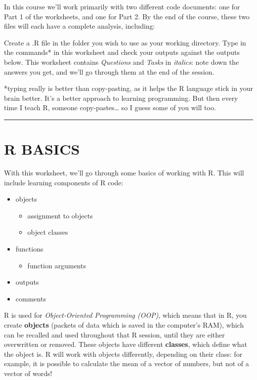 \documentclass[
]{book}
\providecommand{\tightlist}{%
  \setlength{\itemsep}{0pt}\setlength{\parskip}{0pt}}
\begin{document}
In this course we'll work primarily with two different code documents: one
for Part 1 of the worksheets, and one for Part 2. By the end of the course,
these two files will each have a complete analysis, including:

Create a .R file in the folder you wish to use as your working directory. Type
in the commands* in this worksheet and check your outputs against the outputs
below. This worksheet contains \emph{Questions} and \emph{Tasks} in \emph{italics}: note
down the answers you get, and we'll go through them at the end of the session.

*typing really is better than copy-pasting, as it helps the R language stick in your
brain better. It's a better approach to learning programming. But then every time I teach R,
someone copy-pastes\ldots{} so I guess some of you will too.

\begin{center}\rule{0.5\linewidth}{0.5pt}\end{center}

\hypertarget{r-basics-1}{%
\section{R BASICS}\label{r-basics-1}}

With this worksheet, we'll go through some basics of working with R. This will
include learning components of R code:

\begin{itemize}
\tightlist
\item
  objects

  \begin{itemize}
  \tightlist
  \item
    assignment to objects
  \item
    object classes
  \end{itemize}
\item
  functions

  \begin{itemize}
  \tightlist
  \item
    function arguments
  \end{itemize}
\item
  outputs
\item
  comments\\
\end{itemize}

R is used for \emph{Object-Oriented Programming (OOP)}, which means that in R, you
create \textbf{objects} (packets of data which is saved in the computer's RAM), which
can be recalled and used throughout that R session, until they are either
overwritten or removed. These objects have different \textbf{classes}, which define
what the object is. R will work with objects differently, depending on their
class: for example, it is possible to calculate the mean of a vector of numbers,
but not of a vector of words!\\
~\\
\end{document}
